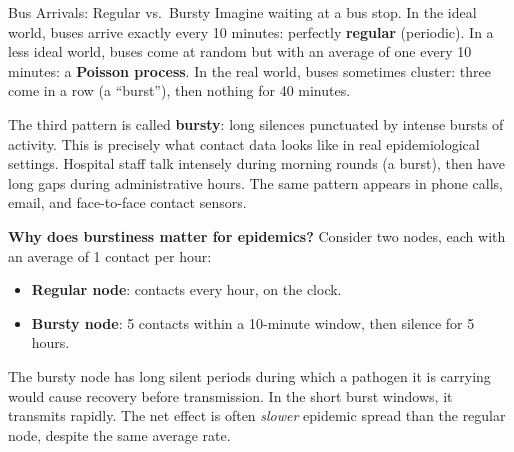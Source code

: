 \begin{analogybox}{Bus Arrivals: Regular vs.\ Bursty}
Imagine waiting at a bus stop. In the ideal world, buses arrive exactly every 10 minutes:
perfectly \textbf{regular} (periodic). In a less ideal world, buses come at random but with an
average of one every 10 minutes: a \textbf{Poisson process}. In the real world, buses sometimes
cluster: three come in a row (a ``burst''), then nothing for 40 minutes.

The third pattern is called \textbf{bursty}: long silences punctuated by intense bursts of
activity. This is precisely what contact data looks like in real epidemiological settings.
Hospital staff talk intensely during morning rounds (a burst), then have long gaps during
administrative hours. The same pattern appears in phone calls, email, and face-to-face contact
sensors.

\textbf{Why does burstiness matter for epidemics?} Consider two nodes, each with an average
of 1 contact per hour:
\begin{itemize}[noitemsep]
  \item \textbf{Regular node}: contacts every hour, on the clock.
  \item \textbf{Bursty node}: 5 contacts within a 10-minute window, then silence for 5 hours.
\end{itemize}
The bursty node has long silent periods during which a pathogen it is carrying would cause
recovery before transmission. In the short burst windows, it transmits rapidly. The net effect
is often \textit{slower} epidemic spread than the regular node, despite the same average rate.
\end{analogybox}

